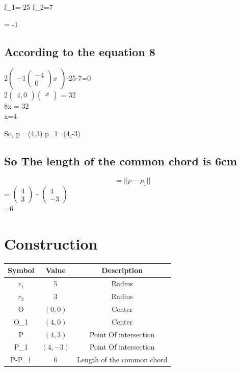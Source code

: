 \documentclass[journal,12pt,twocolumn]{article}
\let\vec\mathbf
\newcommand{\myvec}[1]{\ensuremath{\begin{pmatrix}#1\end{pmatrix}}}
\begin{document}
\vec f_1=-25  \hspace{10mm}
\vec f_2=7






\vspace{10mm}

 \mu = -1
 
 \subsection{According to the equation 8}
 2\myvec{-1 \myvec{-4\\0} x }-25-7=0\\
 \vspace{5mm}
 2\myvec{4 , 0 }\myvec{x\\} = 32\\
\vspace{5mm}
  8x = 32\\
  \vspace{5mm}
   x=4\\
    \vspace{5mm}
    
    So, p =(4,3)
    \hspace{5mm}
    p_1=(4,-3)
\subsection{ So The length of the common chord is 6cm}
   $$= || p - p_1|| $$
        = \myvec{4\\ 3} - \myvec{4 \\ -3} \\
        \vspace{5mm}
        =6
  \section*{\large Construction}
{
\setlength\extrarowheight{5pt}
\begin{tabular}{|c|c|c|}
  \hline
  \textbf{Symbol}&\textbf{Value}&\textbf{Description}\\
  \hline
	$r_1$&5&Radius \\
  \hline
	$r_2$&3&Radius\\
  \hline
  O&$(0,0)$&Center\\
  \hline
  O_1& $(4,0)$ &Center\\
  \hline
  P&$(4,3)$&Point Of intersection\\
  \hline
  P_1&$(4,-3)$&Point Of intersection\\
  \hline
  P-P_1& $6$ &Length of the common chord\\
  \hline
  
  
\end{tabular}
}
\end{document}
